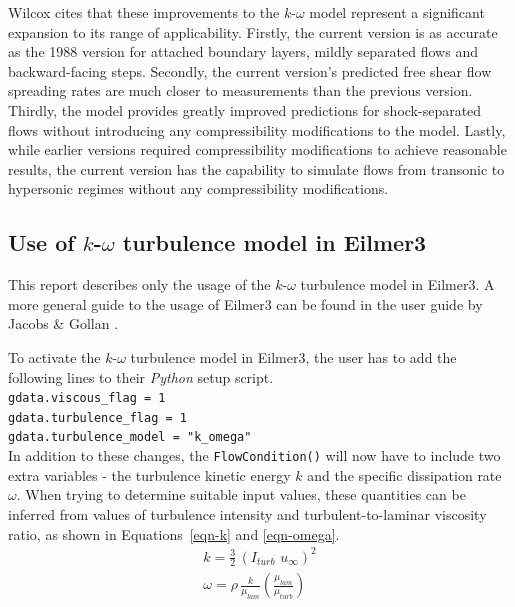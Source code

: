 Wilcox \cite{Wilcox1988} cites that these improvements to the $k$-$\omega$ model 
represent a significant expansion to its range of applicability. Firstly, the 
current version is as accurate as the 1988 version for attached boundary layers, 
mildly separated flows and backward-facing steps. Secondly, the current 
version's predicted free shear flow spreading rates are much closer to 
measurements than the previous version. Thirdly, the model provides 
greatly improved predictions for shock-separated flows without introducing 
any compressibility modifications to the model. Lastly, while earlier versions 
required compressibility modifications to achieve reasonable results, the 
current version has the capability to simulate flows from transonic to 
hypersonic regimes without any compressibility modifications.

\subsection{Use of $k$-$\omega$ turbulence model in Eilmer3}
%
This report describes only the usage of the $k$-$\omega$ turbulence model
in Eilmer3. A more general guide to the usage of Eilmer3 can be found in
the user guide by Jacobs \& Gollan \cite{Jacobs2008}.

To activate the $k$-$\omega$ turbulence model in Eilmer3, the user
has to add the following lines to their \textit{Python} setup script.\\
\indent \texttt{gdata.viscous\_flag = 1} \\
\indent \texttt{gdata.turbulence\_flag = 1} \\
\indent \texttt{gdata.turbulence\_model = "k\_omega"} \\

In addition to these changes, the \texttt{FlowCondition()} will now
have to include two extra variables - the turbulence kinetic energy
$k$ and the specific dissipation rate $\omega$. When trying to determine
suitable input values, these quantities can be inferred from values of 
turbulence intensity and turbulent-to-laminar viscosity ratio, as shown 
in Equations~\ref{eqn-k} and \ref{eqn-omega}.
%
\begin{eqnarray}
k = \frac{3}{2} \, (I_{turb} \, \, u_{\infty})^2 
\label{eqn-k} \\
\omega = \rho \, \frac{k}{\mu_{lam}} \left( \frac{\mu_{lam}}{\mu_{turb}} \right)
\label{eqn-omega}
\end{eqnarray} 
\vspace{0.5cm}

